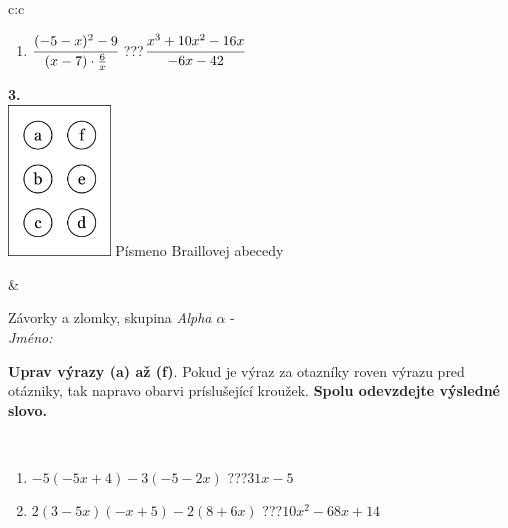 \documentclass[10pt]{report}
\begin{document}
\begin{tabular}{c:c}
\begin{minipage}[c][104.5mm][t]{0.5\linewidth}
\begin{center}
\begin{minipage}{0.79\linewidth}
\begin{center}
\begin{varwidth}{\linewidth}
\begin{enumerate}
\item $\cfrac{(-5-x)^2-9}{(x-7)\cdot\frac{6}{x}}$\quad \dotfill\; ???\;\dotfill \quad $\cfrac{x^3+10x^2-16x}{-6x-42}$
\end{enumerate}
\end{varwidth}
\end{center}
\end{minipage}
\begin{minipage}{0.20\linewidth}
\begin{center}
{\Huge\bfseries 3.} \\[2mm]
\includegraphics[height=40mm]{../images/braille.png}
{\small Písmeno Braillovej abecedy}
\end{center}
\end{minipage}
\end{center}
\end{minipage}
&
\begin{minipage}[c][104.5mm][t]{0.5\linewidth}
\begin{center}
\vspace{7mm}
{\huge Závorky a zlomky, skupina \textit{Alpha $\alpha$} -}\\[5mm]
\textit{Jméno:}\phantom{xxxxxxxxxxxxxxxxxxxxxxxxxxxxxxxxxxxxxxxxxxxxxxxxxxxxxxxxxxxxxxxxx}\\[5mm]
\begin{minipage}{0.95\linewidth}
\begin{center}
\textbf{Uprav výrazy (a) až (f)}. Pokud je výraz za otazníky roven výrazu pred otázniky, tak napravo obarvi príslušející kroužek. \textbf{Spolu odevzdejte výsledné slovo.}
\end{center}
\end{minipage}
\\[1mm]
\begin{minipage}{0.79\linewidth}
\begin{center}
\begin{varwidth}{\linewidth}
\begin{enumerate}
\normalsize
\item $-5(-5x+4)-3(-5-2x)$\quad \dotfill\; ???\;\dotfill \quad $31x-5$
\item $2(3-5x)(-x+5)-2(8+6x)$\quad \dotfill\; ???\;\dotfill \quad $10x^2-68x+14$

\end{enumerate}
\end{varwidth}
\end{center}
\end{minipage}
\end{center}
\end{minipage}
\end{tabular}
\end{document}
